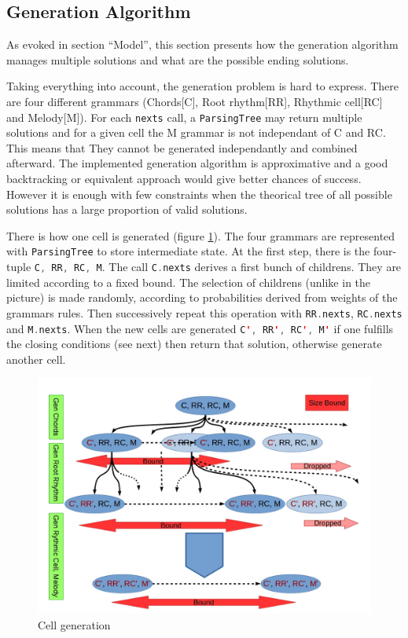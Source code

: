 \documentclass[twocolumn, 11pt]{article}
\newcommand{\code}[1]{\lstinline[language=Scala,columns=fixed,basicstyle=\ttfamily]|#1|}
\begin{document}
\subsection{Generation Algorithm}

As evoked in section ``Model'', this section presents how the generation algorithm manages multiple solutions and what are the possible ending solutions.

Taking everything into account, the generation problem is hard to express. There are four different grammars (Chords[C], Root rhythm[RR], Rhythmic cell[RC] and Melody[M]). For each \code{nexts} call, a \code{ParsingTree} may return multiple solutions and for a given cell the M grammar is not independant of C and RC. This means that They cannot be generated independantly and combined afterward.
The implemented generation algorithm is approximative and a good backtracking or equivalent approach would give better chances of success. However it is enough with few constraints when the theorical tree of all possible solutions has a large proportion of valid solutions.

There is how one cell is generated (figure \ref{fig:cellGen}). The four grammars are represented with \code{ParsingTree} to store intermediate state.
At the first step, there is the four-tuple \code{C, RR, RC, M}. The call \code{C.nexts} derives a first bunch of childrens. They are limited according to a fixed bound. The selection of childrens (unlike in the picture) is made randomly, according to probabilities derived from weights of the grammars rules. Then successively repeat this operation with \code{RR.nexts}, \code{RC.nexts} and \code{M.nexts}. When the new cells are generated \code{C', RR', RC', M'} if one fulfills the closing conditions (see next) then return that solution, otherwise generate another cell.

\onecolumn
\begin{figure}[d]
  \centering
  \includegraphics[width=\textwidth]{boundGen}
  \caption{Cell generation}
  \label{fig:cellGen}
\end{figure}
\twocolumn
\end{document}

